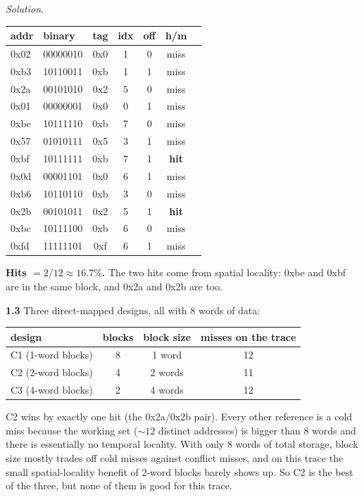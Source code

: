 \documentclass[12pt]{article}
\newenvironment{solution}{\par\noindent\textit{Solution.}\ }{\par\vspace{1.1em}}
\newcommand{\subproblem}[1]{\par\vspace{0.45em}\noindent\textbf{#1}\quad}
\begin{document}
\begin{solution}
\begin{center}
\small
\begin{tabular}{@{}llccccl@{}}
\toprule
addr & binary & tag & idx & off & h/m \\
\midrule
0x02 & 00000010 & 0x0 & 1 & 0 & miss \\
0xb3 & 10110011 & 0xb & 1 & 1 & miss \\
0x2a & 00101010 & 0x2 & 5 & 0 & miss \\
0x01 & 00000001 & 0x0 & 0 & 1 & miss \\
0xbe & 10111110 & 0xb & 7 & 0 & miss \\
0x57 & 01010111 & 0x5 & 3 & 1 & miss \\
0xbf & 10111111 & 0xb & 7 & 1 & \textbf{hit} \\
0x0d & 00001101 & 0x0 & 6 & 1 & miss \\
0xb6 & 10110110 & 0xb & 3 & 0 & miss \\
0x2b & 00101011 & 0x2 & 5 & 1 & \textbf{hit} \\
0xbc & 10111100 & 0xb & 6 & 0 & miss \\
0xfd & 11111101 & 0xf & 6 & 1 & miss \\
\bottomrule
\end{tabular}
\end{center}

\textbf{Hits $= 2/12 \approx 16.7\%$.} The two hits come from spatial locality: 0xbe and 0xbf are in the same block, and 0x2a and 0x2b are too.

\subproblem{1.3} Three direct-mapped designs, all with 8 words of data:

\begin{center}
\small
\begin{tabular}{@{}lccc@{}}
\toprule
design & blocks & block size & misses on the trace \\
\midrule
C1 (1-word blocks) & 8 & 1 word  & 12 \\
C2 (2-word blocks) & 4 & 2 words & 11 \\
C3 (4-word blocks) & 2 & 4 words & 12 \\
\bottomrule
\end{tabular}
\end{center}

C2 wins by exactly one hit (the 0x2a/0x2b pair). Every other reference is a cold miss because the working set ($\sim 12$ distinct addresses) is bigger than 8 words and there is essentially no temporal locality. With only 8 words of total storage, block size mostly trades off cold misses against conflict misses, and on this trace the small spatial-locality benefit of 2-word blocks barely shows up. So C2 is the best of the three, but none of them is good for this trace.
\end{solution}
\end{document}
